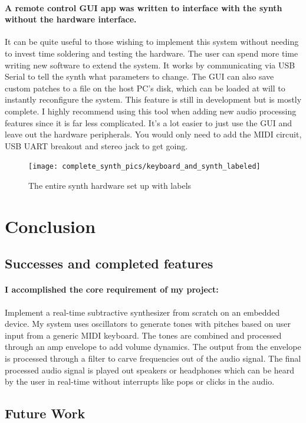 \documentclass[acmlarge,screen]{acmart}
\begin{document}
	\paragraph{A remote control GUI app was written to interface with the synth without the hardware interface.} It can be quite useful to those wishing to implement this system without needing to invest time soldering and testing the hardware. The user can spend more time writing new software to extend the system. It works by communicating via USB Serial to tell the synth what parameters to change. The GUI can also save custom patches to a file on the host PC's disk, which can be loaded at will to instantly reconfigure the system. This feature is still in development but is mostly complete. I highly recommend using this tool when adding new audio processing features since it is far less complicated. It's a lot easier to just use the GUI and leave out the hardware peripherals. You would only need to add the MIDI circuit, USB UART breakout and stereo jack to get going.

	\begin{figure}[H]
		\texttt{[image: complete\_synth\_pics/keyboard\_and\_synth\_labeled]}
		\caption{The entire synth hardware set up with labels}
		\centering
	\end{figure}

\section{Conclusion}
	\subsection{Successes and completed features} 
	\paragraph{I accomplished the core requirement of my project:} Implement a real-time subtractive synthesizer from scratch on an embedded device. My system uses oscillators to generate tones with pitches based on user input from a generic MIDI keyboard. The tones are combined and processed through an amp envelope to add volume dynamics. The output from the envelope is processed through a filter to carve frequencies out of the audio signal. The final processed audio signal is played out speakers or headphones which can be heard by the user in real-time without interrupts like pops or clicks in the audio.
	
	\subsection{Future Work}
\end{document}
